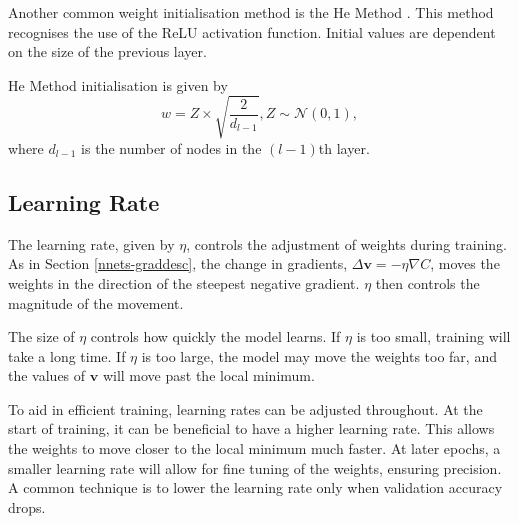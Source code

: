 Another common weight initialisation method is the He Method \cite{HeKaiming2015DDiR}. This method recognises the use of the ReLU activation function. Initial values are dependent on the size of the previous layer.

He Method initialisation is given by
\[
	w = Z\times\sqrt{\dfrac{2}{d_{l-1}}},Z\sim\mathcal{N}(0,1),
\]
where $d_{l-1}$ is the number of nodes in the $(l-1)$th layer.



\subsection{Learning Rate}\label{nnets-learningrate}

The learning rate, given by $\eta$, controls the adjustment of weights during training. As in Section \ref{nnets-graddesc}, the change in gradients, $\Delta\mathbf{v} = -\eta\nabla C$, moves the weights in the direction of the steepest negative gradient. $\eta$ then controls the magnitude of the movement.

The size of $\eta$ controls how quickly the model learns. If $\eta$ is too small, training will take a long time. If $\eta$ is too large, the model may move the weights too far, and the values of $\mathbf{v}$ will move past the local minimum.

To aid in efficient training, learning rates can be adjusted throughout. At the start of training, it can be beneficial to have a higher learning rate. This allows the weights to move closer to the local minimum much faster. At later epochs, a smaller learning rate will allow for fine tuning of the weights, ensuring precision. A common technique is to lower the learning rate only when validation accuracy drops.

